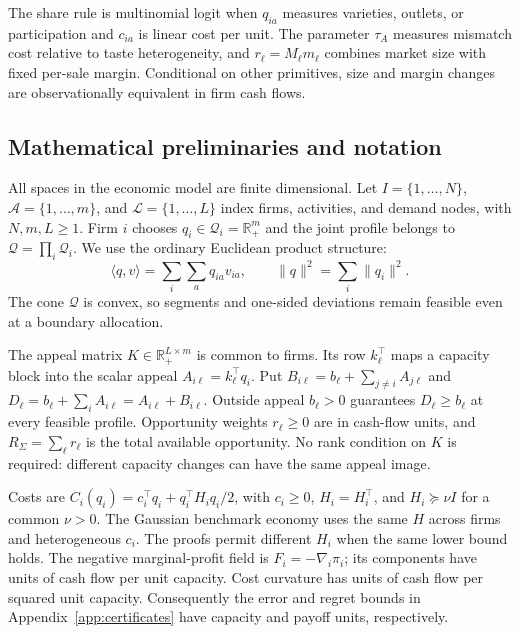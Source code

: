\begin{remark}\label{rem:logit}
  The share rule is multinomial logit \citep{mcfadden_conditional_logit_1974}
  when $q_{ia}$ measures varieties, outlets, or participation and $c_{ia}$
  is linear cost per unit.
  The parameter $\tau_A$ measures mismatch cost relative to taste heterogeneity,
  and $r_\ell=M_\ell m_\ell$ combines market size with fixed per-sale margin.
  Conditional on other primitives, size and margin changes are
  observationally equivalent in firm cash flows.
\end{remark}

\subsection{Mathematical preliminaries and notation}\label{app:proofs}

All spaces in the economic model are finite dimensional.
Let $I=\{1,\ldots,N\}$, $\mathcal A=\{1,\ldots,m\}$, and
$\mathcal L=\{1,\ldots,L\}$ index firms, activities, and demand
nodes, with $N,m,L\geq1$.
Firm $i$ chooses $q_i\in\mathcal Q_i=\mathbb R_+^m$ and the joint
profile belongs to
$\mathcal Q=\prod_i\mathcal Q_i$.
We use the ordinary Euclidean product structure:
\begin{equation}\label{eq:app-inner}
  \langle q,v\rangle=\sum_i\sum_a q_{ia}v_{ia},\qquad
  \|q\|^2=\sum_i\|q_i\|^2.
\end{equation}
The cone $\mathcal Q$ is convex, so segments and one-sided deviations remain
feasible even at a boundary allocation.

The appeal matrix $K\in\mathbb R_+^{L\times m}$ is common to firms.
Its row $k_\ell^\top$ maps a capacity block into the scalar appeal
$A_{i\ell}=k_\ell^\top q_i$.
Put $B_{i\ell}=b_\ell+\sum_{j\ne i}A_{j\ell}$ and
$D_\ell=b_\ell+\sum_i A_{i\ell}=A_{i\ell}+B_{i\ell}$.
Outside appeal $b_\ell>0$ guarantees $D_\ell\geq b_\ell$ at every
feasible profile.
Opportunity weights $r_\ell\geq0$ are in cash-flow units, and
$R_\Sigma=\sum_\ell r_\ell$ is the total available opportunity.
No rank condition on $K$ is required: different capacity changes can
have the same appeal image.

Costs are $C_i(q_i)=c_i^\top q_i+q_i^\top H_i q_i/2$, with $c_i\geq0$,
$H_i=H_i^\top$, and $H_i\succeq\nu I$ for a common $\nu>0$.
The Gaussian benchmark economy uses the same $H$ across firms and
heterogeneous $c_i$.
The proofs permit different $H_i$ when the same lower bound holds.
The negative marginal-profit field is $F_i=-\nabla_i\pi_i$; its
components have units of
cash flow per unit capacity.
Cost curvature has units of cash flow per squared unit capacity.
Consequently the error and regret bounds in
Appendix~\ref{app:certificates} have capacity
and payoff units, respectively.

